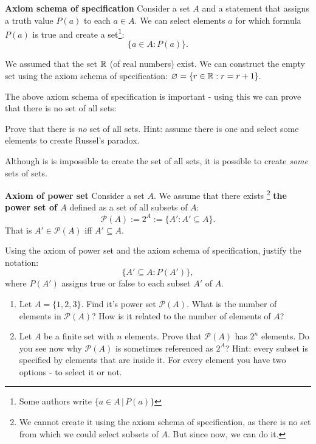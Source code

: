 \begin{definition}
  \textbf{Axiom schema of specification} Consider a set $A$ and a statement that assigns a truth value $P(a)$ to each $a\in A$. We can select elements $a$
  for which formula $P(a)$ is true and create a set\footnote{Some authors write $\{a\in A\,|\,P(a)\}$}:
  $$\{a\in A : P(a)\}.$$
\end{definition}

\begin{example}
  We assumed that the set $\mathbb R$ (of real numbers) exist. We can construct the empty set using the axiom schema of specification:
  $\varnothing=\{r\in\mathbb R : r=r+1\}.$
\end{example}

The above axiom schema of specification is important - using this we can prove that there is no set of all sets:
\begin{exercise}
  Prove that there is \textit{no} set of all sets. Hint: assume there is one and select some elements to create Russel's paradox.
\end{exercise}

Although is is impossible to create the set of all sets, it is possible to create \textit{some} sets of sets.

\begin{definition}
  \textbf{Axiom of power set} Consider a set $A$. We assume that there exists
  \footnote{We cannot create it using the axiom schema of specification, as there is no set from which we could select subsets of $A$. But since now, we can do it.}
  \textbf{the power set of $A$} defined as a set of all subsets of $A$:
  $$\mathcal P(A) := 2^A := \{A' : A'\subseteq A\}.$$
  That is $A'\in \mathcal P(A)$ iff $A'\subseteq A$.
\end{definition}

\begin{exercise}
  Using the axiom of power set and the axiom schema of specification, justify the notation:
  $$\{A'\subseteq A : P(A')\},$$
  where $P(A')$ assigns true or false to each subset $A'$ of $A$.
\end{exercise}

\begin{exercise}
  \begin{enumerate}
    \item Let $A=\{1,2,3\}$. Find it's power set $\mathcal P(A)$. What is the number of elements in $\mathcal P(A)$? How is it related to the
      number of elements of $A$?
    \item Let $A$ be a finite set with $n$ elements. Prove that $\mathcal P(A)$ has $2^n$ elements.
      Do you see now why $\mathcal P(A)$ is sometimes referenced as $2^A$?
      Hint: every subset is specified by elements that are inside it.
      For every element you have two options - to select it or not.
  \end{enumerate}
\end{exercise}

